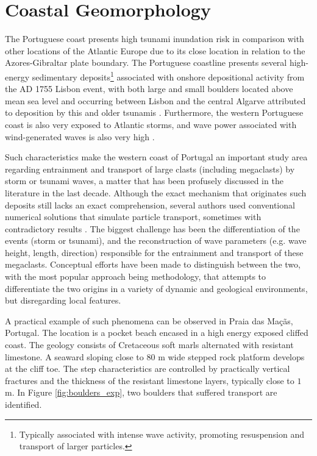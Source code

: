 \section{Coastal Geomorphology}
\label{sec:coastal_geomorphology}

The Portuguese coast presents high tsunami inundation risk in comparison with other locations of the Atlantic Europe due to its close location in relation to the Azores-Gibraltar plate boundary.
The Portuguese coastline presents several high-energy sedimentary deposits\footnote{Typically associated with intense wave activity, promoting resuspension and transport of larger particles.} associated with onshore depositional activity from the AD 1755 Lisbon event, with both large and small boulders located above mean sea level and occurring between Lisbon and the central Algarve attributed to deposition by this and older tsunamis \citep{Scheffers-2005, Costa-2008}. Furthermore, the western Portuguese coast is also very exposed to Atlantic storms, and wave power associated with wind-generated waves is also very high \citep{Oliveira-2011}. 

Such characteristics make the western coast of Portugal an important study area regarding entrainment and transport of large clasts (including megaclasts) by storm or tsunami waves, a matter that has been profusely discussed in the literature in the last decade. Although the exact mechanism that originates such deposits still lacks an exact comprehension, several authors used conventional numerical solutions that simulate particle transport, sometimes with contradictory results \citep{Nandasena-2011, Kain-2012}. The biggest challenge has been the differentiation of the events (storm or tsunami), and the reconstruction of wave parameters (e.g. wave height, length, direction) responsible for the entrainment and transport of these megaclasts. Conceptual efforts have been made to distinguish between the two, with the most popular approach being \cite{Nott-2003} methodology, that attempts to differentiate the two origins in a variety of dynamic and geological environments, but disregarding local features.

A practical example of such phenomena can be observed in Praia das Ma\c{c}\~{a}s, Portugal. The location is a pocket beach encased in a high energy exposed cliffed coast. The geology consists of Cretaceous soft marls alternated with resistant limestone. A seaward sloping close to $80$ m wide stepped rock platform develops at the cliff toe. The step characteristics are controlled by practically vertical fractures and the thickness of the resistant limestone layers, typically close to $1$ m. In Figure \ref{fig:boulders_exp}, two boulders that suffered transport are identified.

